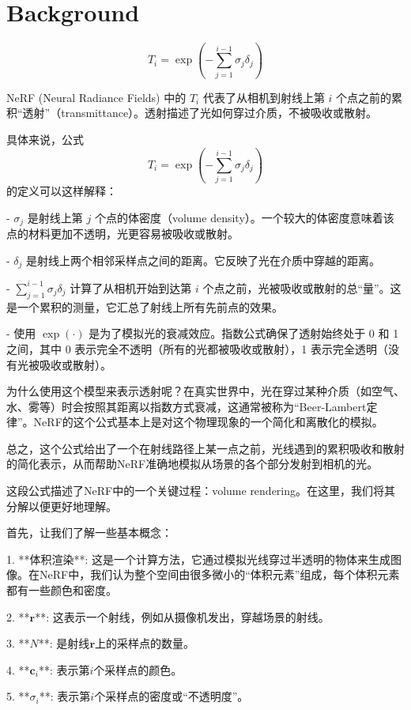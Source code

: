 \documentclass[12pt]{ctexart}
\numberwithin{figure}{section}
\begin{document}
\tableofcontents
\clearpage
\section{Background}
\[T_{i}=\exp \left(-\sum_{j=1}^{i-1} \sigma_{j} \delta_{j}\right)\]

NeRF (Neural Radiance Fields) 中的 \(T_{i}\) 代表了从相机到射线上第 \(i\) 个点之前的累积“透射”（transmittance）。透射描述了光如何穿过介质，不被吸收或散射。

具体来说，公式
\[ T_{i} = \exp \left( -\sum_{j=1}^{i-1} \sigma_{j} \delta_{j} \right) \]
的定义可以这样解释：

- \(\sigma_{j}\) 是射线上第 \(j\) 个点的体密度（volume density）。一个较大的体密度意味着该点的材料更加不透明，光更容易被吸收或散射。
  
- \(\delta_{j}\) 是射线上两个相邻采样点之间的距离。它反映了光在介质中穿越的距离。
  
- \(\sum_{j=1}^{i-1} \sigma_{j} \delta_{j}\) 计算了从相机开始到达第 \(i\) 个点之前，光被吸收或散射的总“量”。这是一个累积的测量，它汇总了射线上所有先前点的效果。
  
- 使用 \(\exp(\cdot)\) 是为了模拟光的衰减效应。指数公式确保了透射始终处于 0 和 1 之间，其中 0 表示完全不透明（所有的光都被吸收或散射），1 表示完全透明（没有光被吸收或散射）。

为什么使用这个模型来表示透射呢？在真实世界中，光在穿过某种介质（如空气、水、雾等）时会按照其距离以指数方式衰减，这通常被称为“Beer-Lambert定律”。NeRF的这个公式基本上是对这个物理现象的一个简化和离散化的模拟。

总之，这个公式给出了一个在射线路径上某一点之前，光线遇到的累积吸收和散射的简化表示，从而帮助NeRF准确地模拟从场景的各个部分发射到相机的光。



这段公式描述了NeRF中的一个关键过程：volume rendering。在这里，我们将其分解以便更好地理解。

首先，让我们了解一些基本概念：

1. **体积渲染**: 这是一个计算方法，它通过模拟光线穿过半透明的物体来生成图像。在NeRF中，我们认为整个空间由很多微小的“体积元素”组成，每个体积元素都有一些颜色和密度。

2. **\(\boldsymbol{r}\)**: 这表示一个射线，例如从摄像机发出，穿越场景的射线。

3. **\(N\)**: 是射线\(\boldsymbol{r}\)上的采样点的数量。

4. **\(\boldsymbol{c}_{i}\)**: 表示第\(i\)个采样点的颜色。

5. **\(\sigma_{i}\)**: 表示第\(i\)个采样点的密度或“不透明度”。
\end{document}
